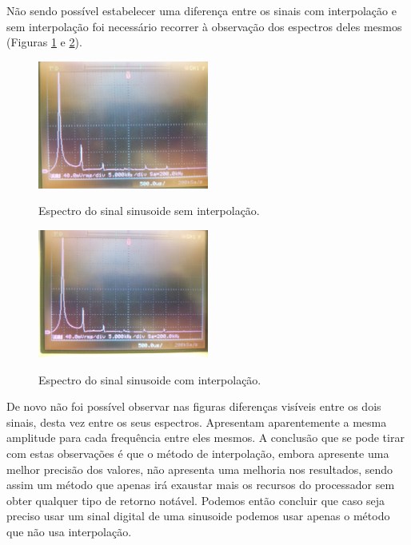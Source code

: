 \documentclass[11pt]{article}
\numberwithin{equation}{section}
\begin{document}
Não sendo possível estabelecer uma diferença entre os sinais com interpolação e sem interpolação foi necessário recorrer à observação dos espectros deles mesmos (Figuras \ref{fig:espect_s_interp} e \ref{fig:espect_c_interp}).
\begin{figure}[H]
	\centering
	\includegraphics[width=0.5\textwidth]{./P1-8_espect_s_interp}~\\
	\caption{Espectro do sinal sinusoide sem interpolação.}
	\label{fig:espect_s_interp}
\end{figure}

\begin{figure}[H]
	\centering
	\includegraphics[width=0.5\textwidth]{./P1-8_espect_c_interp}~\\
	\caption{Espectro do sinal sinusoide com interpolação.}
	\label{fig:espect_c_interp}
\end{figure}

De novo não foi possível observar nas figuras diferenças visíveis entre os dois sinais, desta vez entre os seus espectros. Apresentam aparentemente a mesma amplitude para cada frequência entre eles mesmos.
A conclusão que se pode tirar com estas observações é que o método de interpolação, embora apresente uma melhor precisão dos valores, não apresenta uma melhoria nos resultados, sendo assim um método que apenas irá exaustar mais os recursos do processador sem obter qualquer tipo de retorno notável. Podemos então concluir que caso seja preciso usar um sinal digital de uma sinusoide podemos usar apenas o método que não usa interpolação.
\end{document}
